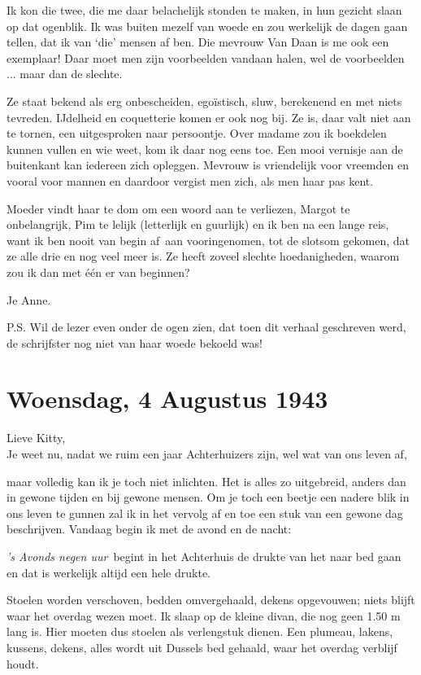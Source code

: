 \documentclass{book}
\begin{document}
Ik kon die twee, die me daar belachelijk stonden te maken, in hun
gezicht slaan op dat ogenblik. Ik was buiten mezelf van woede en zou
werkelijk de dagen gaan tellen, dat ik van `die' mensen af ben. Die
mevrouw Van Daan is me ook een exemplaar! Daar moet men zijn voorbeelden
vandaan halen, wel de voorbeelden ... maar dan de slechte.

Ze staat bekend als erg onbescheiden, egoïstisch, sluw, berekenend en
met niets tevreden. IJdelheid en coquetterie komen er ook nog bij. Ze
is, daar valt niet aan te tornen, een uitgesproken naar persoontje. Over
madame zou ik boekdelen kunnen vullen en wie weet, kom ik daar nog eens
toe. Een mooi vernisje aan de buitenkant kan iedereen zich opleggen.
Mevrouw is vriendelijk voor vreemden en vooral voor mannen en daardoor
vergist men zich, als men haar pas kent.

Moeder vindt haar te dom om een woord aan te verliezen, Margot te
onbelangrijk, Pim te lelijk (letterlijk en guurlijk) en ik ben na een
lange reis, want ik ben nooit van begin af~aan vooringenomen, tot de
slotsom gekomen, dat ze alle drie en nog veel meer is. Ze heeft zoveel
slechte hoedanigheden, waarom zou ik dan met één er van beginnen?

Je Anne.

P.S. Wil de lezer even onder de ogen zien, dat toen dit verhaal
geschreven werd, de schrijfster nog niet van haar woede bekoeld was!

\chapter{Woensdag, 4 Augustus 1943}

Lieve Kitty,\\Je weet nu, nadat we ruim een jaar Achterhuizers zijn, wel
wat van ons leven af,

maar volledig kan ik je toch niet inlichten. Het is alles zo uitgebreid,
anders dan in gewone tijden en bij gewone mensen. Om je toch een beetje
een nadere blik in ons leven te gunnen zal ik in het vervolg af en toe
een stuk van een gewone dag beschrijven. Vandaag begin ik met de avond
en de nacht:

\emph{'s Avonds negen uur}~begint in het Achterhuis de drukte van het
naar bed gaan en dat is werkelijk altijd een hele drukte.

Stoelen worden verschoven, bedden omvergehaald, dekens opgevouwen; niets
blijft waar het overdag wezen moet. Ik slaap op de kleine divan, die nog
geen 1.50 m lang is. Hier moeten dus stoelen als verlengstuk dienen. Een
plumeau, lakens, kussens, dekens, alles wordt uit Dussels bed gehaald,
waar het overdag verblijf houdt.
\end{document}

